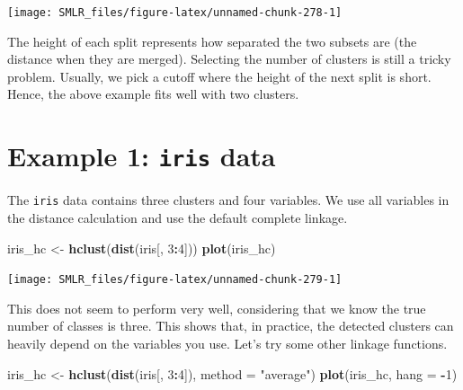 \documentclass[
]{book}
\newenvironment{Shaded}{\begin{snugshade}}{\end{snugshade}}
\newcommand{\AttributeTok}[1]{\textcolor[rgb]{0.13,0.29,0.53}{#1}}
\newcommand{\DecValTok}[1]{\textcolor[rgb]{0.00,0.00,0.81}{#1}}
\newcommand{\FunctionTok}[1]{\textcolor[rgb]{0.13,0.29,0.53}{\textbf{#1}}}
\newcommand{\NormalTok}[1]{#1}
\newcommand{\OtherTok}[1]{\textcolor[rgb]{0.56,0.35,0.01}{#1}}
\newcommand{\SpecialCharTok}[1]{\textcolor[rgb]{0.81,0.36,0.00}{\textbf{#1}}}
\newcommand{\StringTok}[1]{\textcolor[rgb]{0.31,0.60,0.02}{#1}}
\theoremstyle{definition}
\theoremstyle{definition}
\theoremstyle{definition}
\theoremstyle{definition}
\theoremstyle{remark}
\begin{document}
\begin{center}\texttt{[image: SMLR\_files/figure-latex/unnamed-chunk-278-1]} \end{center}

The height of each split represents how separated the two subsets are (the distance when they are merged). Selecting the number of clusters is still a tricky problem. Usually, we pick a cutoff where the height of the next split is short. Hence, the above example fits well with two clusters.

\hypertarget{example-1-iris-data-1}{%
\section{\texorpdfstring{Example 1: \texttt{iris} data}{Example 1: iris data}}\label{example-1-iris-data-1}}

The \texttt{iris} data contains three clusters and four variables. We use all variables in the distance calculation and use the default complete linkage.

\begin{Shaded}
\begin{Highlighting}[]
\NormalTok{  iris\_hc }\OtherTok{\textless{}{-}} \FunctionTok{hclust}\NormalTok{(}\FunctionTok{dist}\NormalTok{(iris[, }\DecValTok{3}\SpecialCharTok{:}\DecValTok{4}\NormalTok{]))}
  \FunctionTok{plot}\NormalTok{(iris\_hc)}
\end{Highlighting}
\end{Shaded}

\begin{center}\texttt{[image: SMLR\_files/figure-latex/unnamed-chunk-279-1]} \end{center}

This does not seem to perform very well, considering that we know the true number of classes is three. This shows that, in practice, the detected clusters can heavily depend on the variables you use. Let's try some other linkage functions.

\begin{Shaded}
\begin{Highlighting}[]
\NormalTok{  iris\_hc }\OtherTok{\textless{}{-}} \FunctionTok{hclust}\NormalTok{(}\FunctionTok{dist}\NormalTok{(iris[, }\DecValTok{3}\SpecialCharTok{:}\DecValTok{4}\NormalTok{]), }\AttributeTok{method =} \StringTok{"average"}\NormalTok{)}
  \FunctionTok{plot}\NormalTok{(iris\_hc, }\AttributeTok{hang =} \SpecialCharTok{{-}}\DecValTok{1}\NormalTok{)}
\end{Highlighting}
\end{Shaded}
\end{document}
